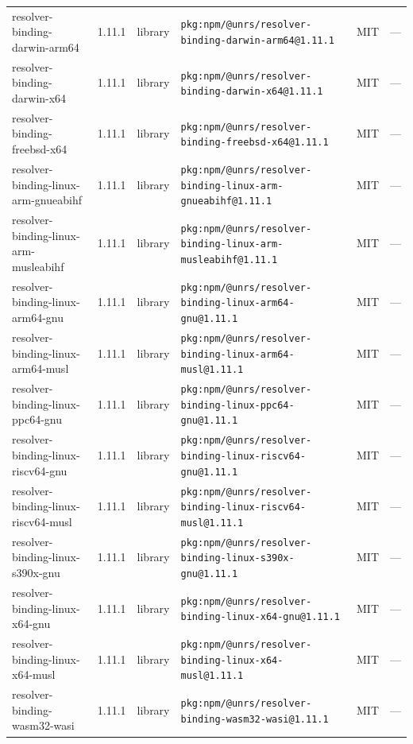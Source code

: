 \documentclass[11pt,a4paper]{article}
\begin{document}
\begin{longtable}{|p{4cm}|p{2cm}|p{1.6cm}|p{5cm}|p{1.5cm}|p{3.5cm}|}
\raggedright resolver-binding-darwin-arm64 & 1.11.1 & library & \small\texttt{pkg:npm/@unrs/resolver-binding-darwin-arm64@1.11.1} & MIT & \small — \\
\raggedright resolver-binding-darwin-x64 & 1.11.1 & library & \small\texttt{pkg:npm/@unrs/resolver-binding-darwin-x64@1.11.1} & MIT & \small — \\
\raggedright resolver-binding-freebsd-x64 & 1.11.1 & library & \small\texttt{pkg:npm/@unrs/resolver-binding-freebsd-x64@1.11.1} & MIT & \small — \\
\raggedright resolver-binding-linux-arm-gnueabihf & 1.11.1 & library & \small\texttt{pkg:npm/@unrs/resolver-binding-linux-arm-gnueabihf@1.11.1} & MIT & \small — \\
\raggedright resolver-binding-linux-arm-musleabihf & 1.11.1 & library & \small\texttt{pkg:npm/@unrs/resolver-binding-linux-arm-musleabihf@1.11.1} & MIT & \small — \\
\raggedright resolver-binding-linux-arm64-gnu & 1.11.1 & library & \small\texttt{pkg:npm/@unrs/resolver-binding-linux-arm64-gnu@1.11.1} & MIT & \small — \\
\raggedright resolver-binding-linux-arm64-musl & 1.11.1 & library & \small\texttt{pkg:npm/@unrs/resolver-binding-linux-arm64-musl@1.11.1} & MIT & \small — \\
\raggedright resolver-binding-linux-ppc64-gnu & 1.11.1 & library & \small\texttt{pkg:npm/@unrs/resolver-binding-linux-ppc64-gnu@1.11.1} & MIT & \small — \\
\raggedright resolver-binding-linux-riscv64-gnu & 1.11.1 & library & \small\texttt{pkg:npm/@unrs/resolver-binding-linux-riscv64-gnu@1.11.1} & MIT & \small — \\
\raggedright resolver-binding-linux-riscv64-musl & 1.11.1 & library & \small\texttt{pkg:npm/@unrs/resolver-binding-linux-riscv64-musl@1.11.1} & MIT & \small — \\
\raggedright resolver-binding-linux-s390x-gnu & 1.11.1 & library & \small\texttt{pkg:npm/@unrs/resolver-binding-linux-s390x-gnu@1.11.1} & MIT & \small — \\
\raggedright resolver-binding-linux-x64-gnu & 1.11.1 & library & \small\texttt{pkg:npm/@unrs/resolver-binding-linux-x64-gnu@1.11.1} & MIT & \small — \\
\raggedright resolver-binding-linux-x64-musl & 1.11.1 & library & \small\texttt{pkg:npm/@unrs/resolver-binding-linux-x64-musl@1.11.1} & MIT & \small — \\
\raggedright resolver-binding-wasm32-wasi & 1.11.1 & library & \small\texttt{pkg:npm/@unrs/resolver-binding-wasm32-wasi@1.11.1} & MIT & \small — \\

\end{longtable}
\end{document}
